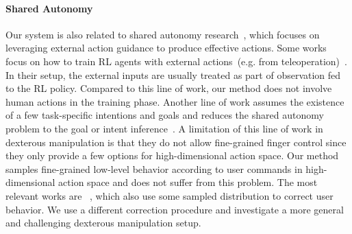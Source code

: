 \paragraph{Shared Autonomy} Our system is also related to shared autonomy research~\cite{aarno2005adaptive, kim2006continuous,carlson2008human, schroer2015autonomous,schwarting2017parallel}, which focuses on leveraging external action guidance to produce effective actions. Some works focus on how to train RL agents with external actions~(e.g. from teleoperation)~\cite{reddy2018shared,du2020ave,reddy2022first}. In their setup, the external inputs are usually treated as part of observation fed to the RL policy. Compared to this line of work, our method does not involve human actions in the training phase. Another line of work assumes the existence of a few task-specific intentions and goals and reduces the shared autonomy problem to the goal or intent inference~\cite{aarno2005adaptive,javdani2015shared}. A limitation of this line of work in dexterous manipulation is that they do not allow fine-grained finger control since they only provide a few options for high-dimensional action space. Our method samples fine-grained low-level behavior according to user commands in high-dimensional action space and does not suffer from this problem.  The most relevant works are ~\cite{broad2019highly, yoneda2023noise}, which also use some sampled distribution to correct user behavior. We use a different correction procedure and investigate a more general and challenging dexterous manipulation setup. 